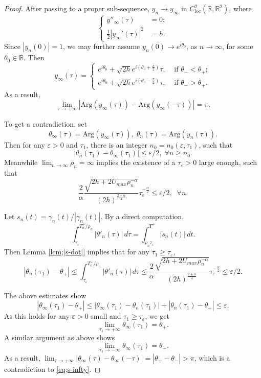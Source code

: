 \documentclass[11pt]{amsart}
\newcommand{\rr}{\mathbb R}
\newcommand{\al}{\alpha}
\newcommand{\gm}{\gamma}
\newcommand{\ep}{\varepsilon}
\newcommand{\tht}{\theta}
\newcommand{\ey}{\frac{1}{2}}
\theoremstyle{plain}
\theoremstyle{definition}
\theoremstyle{remark}
\begin{document}
\begin{proof}
After passing to a proper sub-sequence, $y_n \to y_{\infty}$ in $C^2_{\text{loc}}(\rr, \rr^2)$, where 
$$ \begin{cases}
y''_{\infty}(\tau) & = 0; \\
\ey |y_{\infty}'(\tau)|^2 & = h. 
\end{cases}
$$
Since $|y_n(0)| = 1$, we may further assume $y_n(0) \to e^{i\tht_0}$, as $n \to \infty$, for some $\tht_0 \in \rr$. Then  
\begin{equation*}
\label{eq;y-infty}  y_{\infty}(\tau) =  \begin{cases}
e^{i \tht_0} + \sqrt{2h} e^{i(\tht_0 +\frac{\pi}{2})} \tau, & \text{ if } \tht_- < \tht_+; \\
 e^{i \tht_0} + \sqrt{2h} e^{i(\tht_0 - \frac{\pi}{2})} \tau, & \text{ if } \tht_- > \tht_+.  
\end{cases}   
\end{equation*}
As a result, 
\begin{equation}
\label{eq;s-infty} \lim_{\tau \to + \infty} |\text{Arg}(y_{\infty}(\tau)) - \text{Arg}(y_{\infty}(-\tau))| = \pi. 
\end{equation}

To get a contradiction, set 
$$ \tht_{\infty}(\tau)= \text{Arg}(y_{\infty}(\tau)), \; \tht_n(\tau)= \text{Arg}(y_n(\tau)). $$ 
Then for any $\ep>0$ and $\tau_1$, there is an integer $n_0= n_0(\ep, \tau_1)$, such that   
\begin{equation*}
|\tht_n(\tau_1)-\tht_{\infty}(\tau_1)| \le \ep/2, \; \forall n \ge n_0. 
\end{equation*}
Meanwhile $\lim_{n \to \infty} \rho_n = \infty$ implies the existence of a $\tau_{\ep}>0$ large enough, such that 
\begin{equation*}
\label{eq;tau-ep} \frac{2}{\al} \frac{\sqrt{2h + 2 U_{max} \rho_n^{-\al}}}{(2h)^{\frac{2+\al}{4}}} \tau_{\ep}^{-\frac{\al}{2}} \le \ep/2, \;\; \forall n. 
\end{equation*}

Let  $s_n(t) = \gm_n(t)/|\gm_n(t)|$. By a direct computation, 
$$ \int_{\tau_{\ep}}^{T_n^+/\rho_n} |\tht'_n(\tau)| \,d\tau = \int_{\rho_n \tau_{\ep}}^{T^+} |\dot{s}_n(t)| \,dt 
. $$
Then Lemma \ref{lem;|s-dot|} implies that for any $\tau_1 \ge \tau_{\ep}$,
$$ |\tht_n(\tau_1)-\tht_+| \le \int_{\tau_{\ep}}^{T_n^+/\rho_n} |\tht'_n(\tau)| \,d\tau \le \frac{2}{\al} \frac{\sqrt{2h + 2 U_{max} \rho_n^{-\al}}}{(2h)^{\frac{2+\al}{4}}} \tau_{\ep}^{-\frac{\al}{2}} \le \ep/2.
$$

The above estimates show
$$ |\tht_{\infty}(\tau_1) - \tht_+| \le |\tht_{\infty}(\tau_1) -\tht_n(\tau_1)| + |\tht_n(\tau_1)- \tht_+| \le \ep. $$
As this holds for any $\ep>0$ small and $\tau_1 \ge \tau_{\ep}$, we get  
$$ \lim_{\tau_1 \to +\infty} \tht_{\infty}(\tau_1)=\tht_+. $$
A similar argument as above shows 
$$ \lim_{\tau_1 \to -\infty} \tht_{\infty}(\tau_1)=\tht_-. $$
As a result, $\lim_{\tau \to +\infty}|\tht_{\infty}(\tau) - \tht_{\infty}(-\tau)| = |\tht_+ -\tht_-| >\pi$, which is a contradiction to \eqref{eq;s-infty}.

\end{proof}
\end{document}
